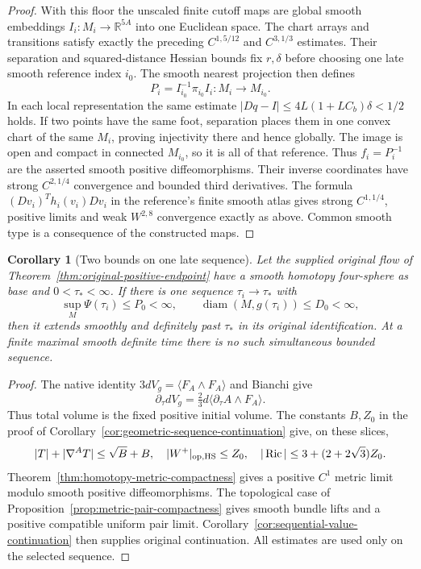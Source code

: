 \documentclass[11pt]{article}
\numberwithin{equation}{section}
\newtheorem{corollary}[theorem]{Corollary}
\theoremstyle{definition}
\theoremstyle{remark}
\DeclareMathOperator{\Ric}{Ric}
\begin{document}
\begin{proof}
With this floor the unscaled finite cutoff maps are global
smooth embeddings $I_i:M_i\to\mathbb R^{5A}$ into one
Euclidean space. The chart arrays and transitions satisfy
exactly the preceding $C^{1,5/12}$ and $C^{3,1/3}$ estimates.
Their separation and squared-distance Hessian bounds fix
$r,\delta$ before choosing one late smooth reference index
$i_0$. The smooth nearest projection then defines
\[
 P_i=I_{i_0}^{-1}\pi_{i_0}I_i:M_i\longrightarrow M_{i_0}.
\]
In each local representation the same estimate
$|Dq-I|\le4L(1+LC_b)\delta<1/2$ holds. If two points
have the same foot, separation places them in one convex
chart of the same $M_i$, proving injectivity there and hence
globally. The image is open and compact in connected $M_{i_0}$,
so it is all of that reference. Thus $f_i=P_i^{-1}$ are the
asserted smooth positive diffeomorphisms. Their inverse
coordinates have strong $C^{2,1/4}$ convergence and bounded
third derivatives. The formula $(Dv_i)^Th_i(v_i)Dv_i$ in
the reference's finite smooth atlas gives strong $C^{1,1/4}$,
positive limits and weak $W^{2,8}$ convergence exactly as above.
Common smooth type is a consequence of the constructed maps.
\end{proof}

\begin{corollary}[Two bounds on one late sequence]
\label{cor:homotopy-two-bound-continuation}
Let the supplied original flow of
Theorem~\ref{thm:original-positive-endpoint} have a smooth
homotopy four-sphere as base and \(0<\tau_*<\infty\).
If there is one sequence \(\tau_i\to\tau_*\) with
\[
 \sup_M\Psi(\tau_i)\le P_0<\infty,\qquad
 \operatorname{diam}(M,g(\tau_i))\le D_0<\infty,
\]
then it extends smoothly and definitely past \(\tau_*\)
in its original identification. At a finite maximal smooth
definite time there is no such simultaneous bounded sequence.
\end{corollary}

\begin{proof}
The native identity \(3dV_g=\langle F_A\wedge F_A\rangle\)
and Bianchi give
\[
 \partial_\tau dV_g=\tfrac23d\langle\partial_\tau A\wedge F_A\rangle.
\]
Thus total volume is the fixed positive initial volume.
The constants \(B,Z_0\) in the proof of
Corollary~\ref{cor:geometric-sequence-continuation} give, on
these slices,
\[
 |T|+|\nabla^AT|\le\sqrt B+B,\quad
 |W^+|_{\rm op,HS}\le Z_0,\quad
 |\Ric|\le3+(2+2\sqrt3)Z_0.
\]
Theorem~\ref{thm:homotopy-metric-compactness} gives a positive
\(C^1\) metric limit modulo smooth positive diffeomorphisms.
The topological case of Proposition~\ref{prop:metric-pair-compactness}
gives smooth bundle lifts and a positive compatible uniform
pair limit. Corollary~\ref{cor:sequential-value-continuation}
then supplies original continuation. All estimates are used
only on the selected sequence.
\end{proof}
\end{document}

